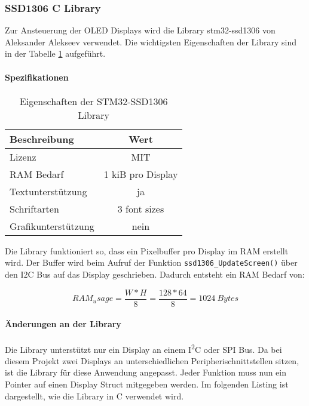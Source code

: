 \subsubsection{SSD1306 C Library}
\label{sec:Library_ssd1306}

Zur Ansteuerung der OLED Displays wird die Library stm32-ssd1306 von Aleksander Alekseev \cite{stm32-ssd1306} verwendet. Die wichtigsten Eigenschaften der Library sind in der Tabelle \ref{tab:LibSSD1306} aufgeführt.

\paragraph{Spezifikationen}

\begin{table}[H]
	\centering
	\begin{tabular}{|l|c|}
		\hline
		\textbf{Beschreibung} & \textbf{Wert}     \\ \hline
		Lizenz                & MIT               \\ \hline
		RAM Bedarf            & 1 kiB pro Display \\ \hline
		Textunterstützung     & ja                \\ \hline
		Schriftarten          & 3 font sizes      \\ \hline
		Grafikunterstützung   & nein              \\ \hline
	\end{tabular}
	\caption{Eigenschaften der STM32-SSD1306 Library}
	\label{tab:LibSSD1306}
\end{table}

Die Library funktioniert so, dass ein Pixelbuffer pro Display im RAM erstellt wird.
Der Buffer wird beim Aufruf der Funktion \texttt{ssd1306\_UpdateScreen()} über den I2C Bus auf das Display geschrieben.
Dadurch entsteht ein RAM Bedarf von:

\begin{equation}
RAM_usage=\frac{W * H}{8} = \frac{128 * 64}{8} = 1024\ \si{Bytes}
\end{equation}

\paragraph{Änderungen an der Library}

Die Library unterstützt nur ein Display an einem I\textsuperscript{2}C oder SPI Bus. Da bei diesem Projekt zwei Displays an unterschiedlichen Peripherischnittstellen sitzen, ist die Library für diese Anwendung angepasst.
Jeder Funktion muss nun ein Pointer auf einen Display Struct mitgegeben werden.
Im folgenden Listing ist dargestellt, wie die Library in C verwendet wird.

